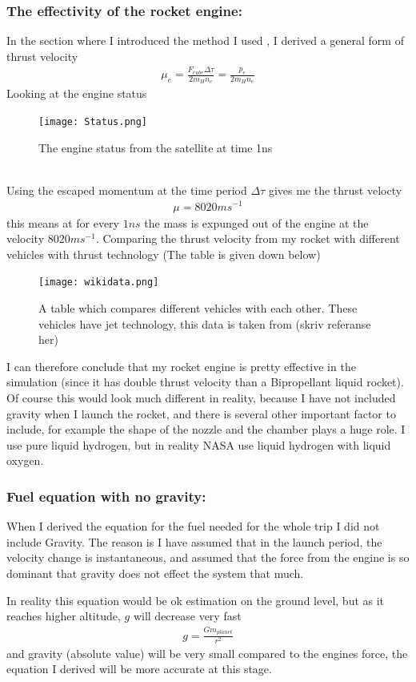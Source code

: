 \documentclass[a4paper,11pt,english]{report}
\begin{document}
\subsubsection{The effectivity of the rocket engine:}
In the section where I introduced the
method I used , I derived a general form of thrust velocity
\begin{align}
  \mu_{e} = \frac{F_{cube}\Delta \tau}{2m_{H}n_{e}} = \frac{p_{e}}{2m_{H}n_{e}}
\end{align}
Looking at the engine status
\begin{figure}[h]
  \centering
  \texttt{[image: Status.png]}
  \caption{The engine status from the satellite at time 1ns}
\end{figure}
\\
Using the escaped momentum at the time
period \(\Delta \tau\) gives me the thrust velocty
\begin{align}
  \mu = 8020ms^{-1}
\end{align}
this means at for every \(1ns\) the mass is expunged out of the engine  at the velocity
\(8020ms^{-1}\).  Comparing the thrust velocity from my rocket with different vehicles with
thrust technology (The table is given down below)
\newpage
\begin{figure}[h]
  \centering
  \texttt{[image: wikidata.png]}
  \caption{A table which compares different vehicles with each other. These
    vehicles have jet technology, this
    data is taken from (skriv referanse her)}
\end{figure}
I can therefore conclude that my rocket engine is pretty effective in the
simulation (since it has double thrust velocity than a Bipropellant liquid
rocket). Of course this would look much different in reality, because I have
not included gravity when I launch the rocket, and there is several other
important factor to include, for example the shape of the nozzle and the
chamber plays a huge role. I use pure liquid hydrogen, but in reality NASA use
liquid hydrogen with liquid oxygen.
\subsubsection{Fuel equation with no gravity:} When I derived the equation
for the fuel needed for the whole trip I did not include Gravity. The reason is
I have assumed that in the launch period, the velocity change is instantaneous,
and assumed that the force from the engine is so dominant that gravity does not
effect the system that much.

In reality this equation would be ok estimation on the ground level, but as it
reaches higher altitude, \(g\) will decrease very fast
\begin{align}
  g = \frac{Gm_{planet}}{r^{2}}
\end{align}
and gravity (absolute value) will be very small compared to the engines force,
the equation I derived will be more accurate at this stage. 
\end{document}
